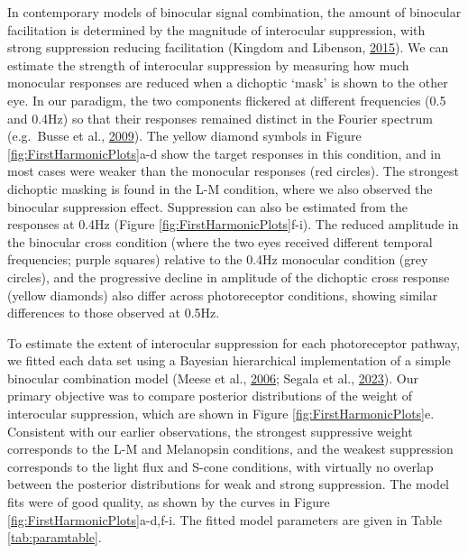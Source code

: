 \documentclass[
]{article}
\begin{document}
In contemporary models of binocular signal combination, the amount of binocular facilitation is determined by the magnitude of interocular suppression, with strong suppression reducing facilitation (Kingdom and Libenson, \protect\hyperlink{ref-Kingdom2015}{2015}). We can estimate the strength of interocular suppression by measuring how much monocular responses are reduced when a dichoptic `mask' is shown to the other eye. In our paradigm, the two components flickered at different frequencies (0.5 and 0.4Hz) so that their responses remained distinct in the Fourier spectrum (e.g.~Busse et al., \protect\hyperlink{ref-Busse2009}{2009}). The yellow diamond symbols in Figure \ref{fig:FirstHarmonicPlots}a-d show the target responses in this condition, and in most cases were weaker than the monocular responses (red circles). The strongest dichoptic masking is found in the L-M condition, where we also observed the binocular suppression effect. Suppression can also be estimated from the responses at 0.4Hz (Figure \ref{fig:FirstHarmonicPlots}f-i). The reduced amplitude in the binocular cross condition (where the two eyes received different temporal frequencies; purple squares) relative to the 0.4Hz monocular condition (grey circles), and the progressive decline in amplitude of the dichoptic cross response (yellow diamonds) also differ across photoreceptor conditions, showing similar differences to those observed at 0.5Hz.

To estimate the extent of interocular suppression for each photoreceptor pathway, we fitted each data set using a Bayesian hierarchical implementation of a simple binocular combination model (Meese et al., \protect\hyperlink{ref-Meese2006}{2006}; Segala et al., \protect\hyperlink{ref-Segala2023}{2023}). Our primary objective was to compare posterior distributions of the weight of interocular suppression, which are shown in Figure \ref{fig:FirstHarmonicPlots}e. Consistent with our earlier observations, the strongest suppressive weight corresponds to the L-M and Melanopsin conditions, and the weakest suppression corresponds to the light flux and S-cone conditions, with virtually no overlap between the posterior distributions for weak and strong suppression. The model fits were of good quality, as shown by the curves in Figure \ref{fig:FirstHarmonicPlots}a-d,f-i. The fitted model parameters are given in Table \ref{tab:paramtable}.
\end{document}
